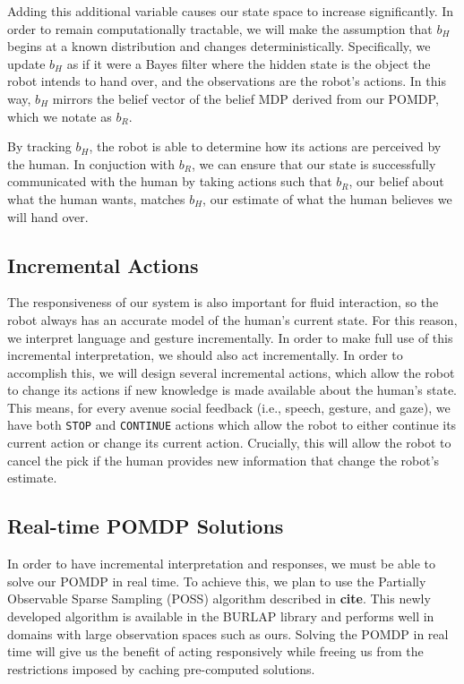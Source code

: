 \documentclass{article}
\begin{document}
Adding this additional variable causes our state space to increase significantly. In order to remain computationally tractable, we will make the assumption that $b_H$ begins at a known distribution and changes deterministically. Specifically, we update $b_H$ as if it were a Bayes filter \citep{meldon} where the hidden state is the object the robot intends to hand over, and the observations are the robot's actions. In this way, $b_H$ mirrors the belief vector of the belief MDP derived from our POMDP, which we notate as $b_R$. 

By tracking $b_H$, the robot is able to determine how its actions are perceived by the human. In conjuction with $b_R$, we can ensure that our state is successfully communicated with the human by taking actions such that $b_R$, our belief about what the human wants, matches $b_H$, our estimate of what the human believes we will hand over. 


\subsection{Incremental Actions}

The responsiveness of our system is also important for fluid interaction, so the robot always has an accurate model of the human's current state. For this reason, we interpret language and gesture incrementally. In order to make full use of this incremental interpretation, we should also act incrementally. In order to accomplish this, we will design several incremental actions, which allow the robot to change its actions if new knowledge is made available about the human's state. This means, for every avenue social feedback (i.e., speech, gesture, and gaze), we have both \texttt{STOP} and \texttt{CONTINUE} actions which allow the robot to either continue its current action or change its current action. Crucially, this will allow the robot to cancel the pick if the human provides new information that change the robot's estimate. 

\subsection{Real-time POMDP Solutions}

In order to have incremental interpretation and responses, we must be able to solve our POMDP in real time. To achieve this, we plan to use the Partially Observable Sparse Sampling (POSS) algorithm described in \textbf{cite}. This newly developed algorithm is available in the BURLAP library and performs well in domains with large observation spaces such as ours. Solving the POMDP in real time will give us the benefit of acting responsively while freeing us from the restrictions imposed by caching pre-computed solutions. 
\end{document}
